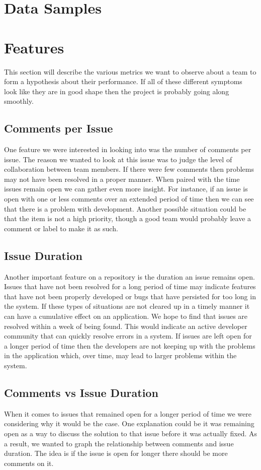 \documentclass[conference]{IEEEtran}
\begin{document}
\section{Data Samples}

\section{Features}
This section will describe the various metrics we want to observe about a team to form a hypothesis about their performance. If all of these different symptoms look like they are in good shape then the project is probably going along smoothly. 

\subsection{Comments per Issue}
One feature we were interested in looking into was the number of comments per issue. The reason we wanted to look at this issue was to judge the level of collaboration between team members. If there were few comments then problems may not have been resolved in a proper manner. When paired with the time issues remain open we can gather even more insight. For instance, if an issue is open with one or less comments over an extended period of time then we can see that there is a problem with development. Another possible situation could be that the item is not a high priority, though a good team would probably leave a comment or label to make it as such. 

\subsection{Issue Duration}
Another important feature on a repository is the duration an issue remains open. Issues that have not been resolved for a long period of time may indicate features that have not been properly developed or bugs that have persisted for too long in the system. If these types of situations are not cleared up in a timely manner it can have a cumulative effect on an application. We hope to find that issues are resolved within a week of being found. This would indicate an active developer community that can quickly resolve errors in a system. If issues are left open for a longer period of time then the developers are not keeping up with the problems in the application which, over time, may lead to larger problems within the system. 

\subsection{Comments vs Issue Duration}
When it comes to issues that remained open for a longer period of time we were considering why it would be the case. One explanation could be it was remaining open as a way to discuss the solution to that issue before it was actually fixed. As a result, we wanted to graph the relationship between comments and issue duration. The idea is if the issue is open for longer there should be more comments on it. 
\end{document}
